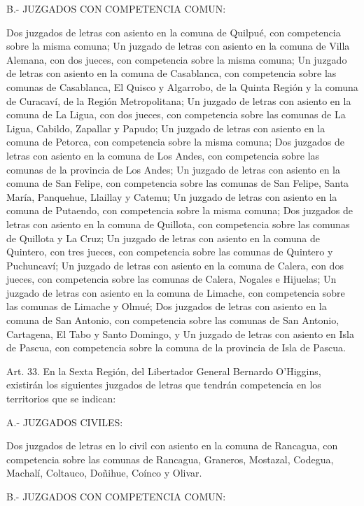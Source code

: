     B.- JUZGADOS CON COMPETENCIA COMUN:

    Dos juzgados de letras con asiento en la comuna de Quilpué, con competencia sobre la misma comuna;
    Un juzgado de letras con asiento en la comuna de Villa Alemana, con dos jueces, con competencia sobre la misma comuna;
    Un juzgado de letras con asiento en la comuna de Casablanca, con competencia sobre las comunas de Casablanca, El Quisco y Algarrobo, de la Quinta Región y la comuna de Curacaví, de la Región Metropolitana;
    Un juzgado de letras con asiento en la comuna de La Ligua, con dos jueces, con competencia sobre las comunas de La Ligua, Cabildo, Zapallar y Papudo;
    Un juzgado de letras con asiento en la comuna de Petorca, con competencia sobre la misma comuna;
    Dos juzgados de letras con asiento en la comuna de Los Andes, con competencia sobre las comunas de la provincia de Los Andes;
    Un juzgado de letras con asiento en la comuna de San Felipe, con competencia sobre las comunas de San Felipe, Santa María, Panquehue, Llaillay y Catemu;
    Un juzgado de letras con asiento en la comuna de Putaendo, con competencia sobre la misma comuna;
    Dos juzgados de letras con asiento en la comuna de Quillota, con competencia sobre las comunas de Quillota y La Cruz;
    Un juzgado de letras con asiento en la comuna de Quintero, con tres jueces, con competencia sobre las comunas de Quintero y Puchuncaví;
    Un juzgado de letras con asiento en la comuna de Calera, con dos jueces, con competencia sobre las comunas de Calera, Nogales e Hijuelas;
    Un juzgado de letras con asiento en la comuna de Limache, con competencia sobre las comunas de Limache y Olmué;
    Dos juzgados de letras con asiento en la comuna de San Antonio, con competencia sobre las comunas de San Antonio, Cartagena, El Tabo y Santo Domingo, y
    Un juzgado de letras con asiento en Isla de Pascua, con competencia sobre la comuna de la provincia de Isla de Pascua.


    Art. 33. En la Sexta Región, del Libertador General Bernardo O'Higgins, existirán los siguientes juzgados de letras que tendrán competencia en los territorios que se indican:

    A.- JUZGADOS CIVILES:

    Dos juzgados de letras en lo civil con asiento en la comuna de Rancagua, con competencia sobre las comunas de Rancagua, Graneros, Mostazal, Codegua, Machalí, Coltauco, Doñihue, Coínco y Olivar.

    B.- JUZGADOS CON COMPETENCIA COMUN:

